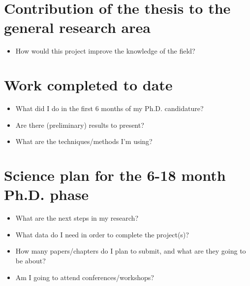 \documentclass[useAMS,usenatbib,onecolumn]{mnras}
\begin{document}
\section{Contribution of the thesis to the general research area}
\label{sec:contribution}

\begin{itemize}
  \item{How would this project improve the knowledge of the field?}
\end{itemize}


\section{Work completed to date}
\label{sec:current}

\begin{itemize}
	\item{What did I do in the first 6 months of my Ph.D. candidature?}
	\item{Are there (preliminary) results to present?}
	\item{What are the techniques/methods I'm using?}
\end{itemize}



\section{Science plan for the 6-18 month Ph.D. phase}
\label{sec:future}
\begin{itemize}
  \item{What are the next steps in my research?}
  \item{What data do I need in order to complete the project(s)?}
  \item{How many papers/chapters do I plan to submit, and what are they going to be about?}
  \item{Am I going to attend conferences/workshops?\\}
\end{itemize}
\end{document}
